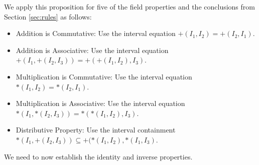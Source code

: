 \documentclass[12pt]{article}
\theoremstyle{remark}
\begin{document}
We apply this proposition for five of the field properties and the conclusions from Section \ref{sec:rules} as follows: 

\begin{itemize}
    \item Addition is Commutative:  Use the interval equation $+(I_1, I_2) = +(I_2, I_1)$.
    \item Addition is Associative: Use the interval equation $+(I_1, +(I_2, I_3)) = +(+(I_1, I_2), I_3)$.
    \item Multiplication is Commutative: Use the interval equation $*(I_1, I_2) = *(I_2, I_1)$.
    \item Multiplication is Associative: Use the interval equation $*(I_1, *(I_2, I_3)) = *(*(I_1, I_2), I_3)$.
    \item Distributive Property: Use the interval containment $*(I_1, +(I_2, I_3)) \subseteq +(*(I_1, I_2), *(I_1, I_3)$.
\end{itemize}

We need to now establish the identity and inverse properties. 
\end{document}
